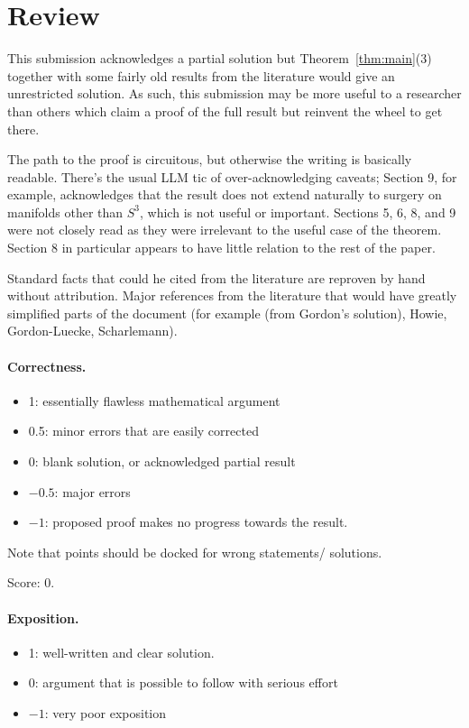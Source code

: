 \documentclass[11pt]{article}
\theoremstyle{remark}
\begin{document}
\maketitle

\section{Review}

This submission acknowledges a partial solution but Theorem~\ref{thm:main}(3) together with some fairly old results from the literature would give an unrestricted solution. As such, this submission may be more useful to a researcher than others which claim a proof of the full result but reinvent the wheel to get there.

The path to the proof is circuitous, but otherwise the writing is basically readable. There's the usual LLM tic of over-acknowledging caveats; Section 9, for example, acknowledges that the result does not extend naturally to surgery on manifolds other than $S^3$, which is not useful or important. Sections 5, 6, 8, and 9 were not closely read as they were irrelevant to the useful case of the theorem. Section 8 in particular appears to have little relation to the rest of the paper.

Standard facts that could he cited from the literature are reproven by hand without attribution. Major references from the literature that would have greatly simplified parts of the document (for example (from Gordon's solution), Howie, Gordon-Luecke, Scharlemann).

\paragraph{Correctness.}
\begin{itemize}
	\item  1: essentially flawless mathematical argument
	\item  0.5: minor errors that are easily corrected
	\item  0: blank solution, or acknowledged partial result
	\item  $-0.5$: major errors
	\item  $-1$: proposed proof makes no progress towards the result.
\end{itemize}
Note that points should be docked for wrong statements/ solutions.

\noindent Score: $0$.

\paragraph{Exposition.}
\begin{itemize}
	\item  1: well-written and clear solution.
	\item  0: argument that is possible to follow with serious effort
	\item  $-1$: very poor exposition
\end{itemize}
\end{document}
